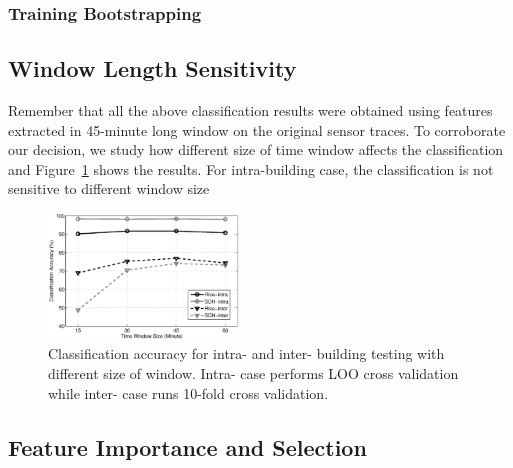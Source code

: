 \subsubsection{Training Bootstrapping}

\subsection{Window Length Sensitivity}
Remember that all the above classification results were obtained using features extracted in 45-minute long window on the original sensor traces. To corroborate our decision, we study how different size of time window affects the classification and Figure~\ref{fig:window} shows the results. For intra-building case, the classification is not sensitive to different window size 

\begin{figure}[h!]
\centering
	\includegraphics[width=0.45\textwidth]{./fig/window.eps}
\caption{Classification accuracy for intra- and inter- building testing with different size of window. Intra- case performs LOO cross validation while inter- case runs 10-fold cross validation.}
\label{fig:window}
\end{figure}


\subsection{Feature Importance and Selection}

